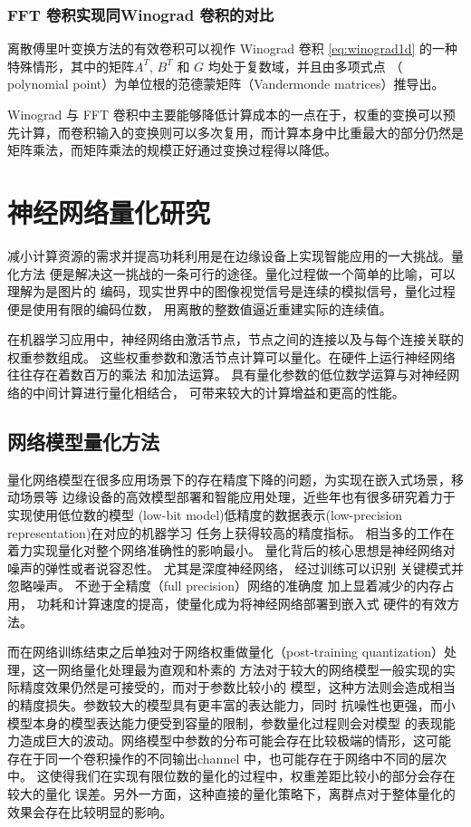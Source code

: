 \subsubsection{FFT 卷积实现同Winograd 卷积的对比}

离散傅里叶变换方法的有效卷积可以视作 Winograd 卷积 \ref{eq:winograd1d} 的一种特殊情形，其中的矩阵$A^T$, $B^T$ 和 $G$ 均处于复数域，并且由多项式点
（ polynomial point）为单位根的范德蒙矩阵（Vandermonde matrices）推导出。

Winograd 与 FFT 卷积中主要能够降低计算成本的一点在于，权重的变换可以预先计算，而卷积输入的变换则可以多次复用，而计算本身中比重最大的部分仍然是矩阵乘法，而矩阵乘法的规模正好通过变换过程得以降低。


\section{神经网络量化研究}

减小计算资源的需求并提高功耗利用是在边缘设备上实现智能应用的一大挑战。量化方法
便是解决这一挑战的一条可行的途径。量化过程做一个简单的比喻，可以理解为是图片的
编码，现实世界中的图像视觉信号是连续的模拟信号，量化过程便是使用有限的编码位数，
用离散的整数值逼近重建实际的连续值。

在机器学习应用中，神经网络由激活节点，节点之间的连接以及与每个连接关联的权重参数组成。
这些权重参数和激活节点计算可以量化。在硬件上运行神经网络往往存在着数百万的乘法
和加法运算。 具有量化参数的低位数学运算与对神经网络的中间计算进行量化相结合，
可带来较大的计算增益和更高的性能。

\subsection{网络模型量化方法}
量化网络模型在很多应用场景下的存在精度下降的问题，为实现在嵌入式场景，移动场景等
边缘设备的高效模型部署和智能应用处理，近些年也有很多研究着力于实现使用低位数的模型
(low-bit model)低精度的数据表示(low-precision representation)在对应的机器学习
任务上获得较高的精度指标。 相当多的工作在着力实现量化对整个网络准确性的影响最小。
量化背后的核心思想是神经网络对噪声的弹性或者说容忍性。 尤其是深度神经网络，
经过训练可以识别 关键模式并忽略噪声。 不逊于全精度（full precision）网络的准确度
加上显着减少的内存占用， 功耗和计算速度的提高，使量化成为将神经网络部署到嵌入式
硬件的有效方法。

而在网络训练结束之后单独对于网络权重做量化（post-training quantization）处理，这一网络量化处理最为直观和朴素的
方法对于较大的网络模型一般实现的实际精度效果仍然是可接受的，而对于参数比较小的
模型，这种方法则会造成相当的精度损失。参数较大的模型具有更丰富的表达能力，同时
抗噪性也更强，而小模型本身的模型表达能力便受到容量的限制，参数量化过程则会对模型
的表现能力造成巨大的波动。网络模型中参数的分布可能会存在比较极端的情形，这可能
存在于同一个卷积操作的不同输出channel 中，也可能存在于网络中不同的层次中。
这使得我们在实现有限位数的量化的过程中，权重差距比较小的部分会存在较大的量化
误差。另外一方面，这种直接的量化策略下，离群点对于整体量化的效果会存在比较明显的影响。

